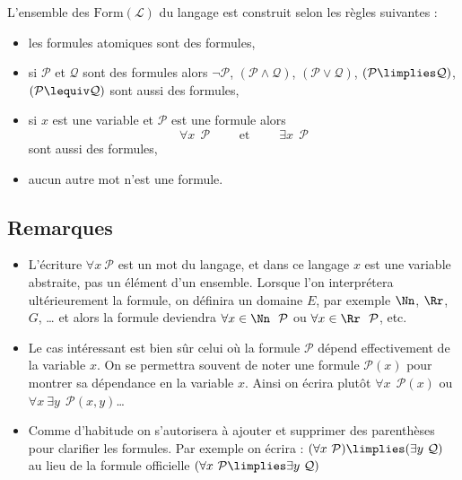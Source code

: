\documentclass[11pt,class=report,crop=false]{standalone}
\begin{document}
\begin{definition}
L'ensemble des  $\text{Form}(\mathcal{L})$ du langage est construit selon les règles suivantes :
\begin{itemize}
	\item les formules atomiques sont des formules,
	
	\item si $\mathcal{P}$ et $\mathcal{Q}$ sont des formules alors
	$\lnot \mathcal{P}$, 
	$(\mathcal{P} \land \mathcal{Q})$,
	$(\mathcal{P} \lor \mathcal{Q})$,
	$(\mathcal{P} \limplies \mathcal{Q})$,
	$(\mathcal{P} \lequiv \mathcal{Q})$ sont aussi des formules,
	 
	\item si $x$ est une variable et $\mathcal{P}$ est une formule alors 
	\[\forall x \ \ \mathcal{P} 
	\qquad \text{ et } \qquad
	\exists x \ \ \mathcal{P} 
	\]
	sont aussi des formules,
	
	\item aucun autre mot n'est une formule.
\end{itemize}
\end{definition}

\subsection{Remarques}

\begin{itemize}
	\item L'écriture \og{}$\forall x \ \mathcal{P}$\fg{} est un mot du langage, et dans ce langage $x$ est une variable abstraite, pas un élément d'un ensemble. Lorsque l'on interprétera ultérieurement la formule, on définira un domaine $E$, par exemple $\Nn$, $\Rr$, $G$, \ldots{} et alors la formule deviendra \og{}$\forall x \in \Nn \ \ \mathcal{P}$\fg{} ou
	 \og{}$\forall x \in \Rr \ \ \mathcal{P}$\fg{}, etc.
	
	\item Le cas intéressant est bien sûr celui où la formule $\mathcal{P}$ dépend effectivement de la variable $x$. On se permettra souvent de noter une formule $\mathcal{P}(x)$ pour montrer sa dépendance en la variable $x$. 
	Ainsi on écrira plutôt \og{}$\forall x \ \ \mathcal{P}(x)$\fg{}
	ou \og{}$\forall x \ \exists y \ \ \mathcal{P}(x,y)$\fg{}\ldots
	
	\item Comme d'habitude on s'autorisera à ajouter et supprimer des parenthèses pour clarifier les formules. Par exemple on écrira :
	\og{}$(\forall x \ \mathcal{P}) \limplies (\exists y \ \mathcal{Q})$\fg{}
	au lieu de la formule officielle \og{}$(\forall x \ \mathcal{P} \limplies \exists y \ \mathcal{Q})$\fg{}
\end{itemize}
\end{document}
